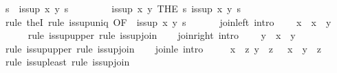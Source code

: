 \begin{isabellebody}
\ s\ \ {\isachardoublequoteopen}is{\isacharunderscore}sup\ x\ y\ s{\isachardoublequoteclose}\ \isacommand{{\isachardot}{\isachardot}}\isamarkupfalse%
\isanewline
\ \ \ \ \isamarkupfalse%
\ \isamarkupfalse%
\ {\isachardoublequoteopen}is{\isacharunderscore}sup\ x\ y\ {\isacharparenleft}THE\ s{\isachardot}\ is{\isacharunderscore}sup\ x\ y\ s{\isacharparenright}{\isachardoublequoteclose}\isanewline
\ \ \ \ \ \ \isamarkupfalse%
\ {\isacharparenleft}rule\ theI{\isacharparenright}\ {\isacharparenleft}rule\ is{\isacharunderscore}sup{\isacharunderscore}uniq\ {\isacharbrackleft}OF\ {\isacharunderscore}\ {\isacharbackquoteopen}is{\isacharunderscore}sup\ x\ y\ s{\isacharbackquoteclose}{\isacharbrackright}{\isacharparenright}\isanewline
\ \ \isamarkupfalse%
\isanewline
\isanewline
\ \ \isamarkupfalse%
\ join{\isacharunderscore}left\ {\isacharbrackleft}intro{\isacharquery}{\isacharbrackright}{\isacharcolon}\isanewline
\ \ \ \ {\isachardoublequoteopen}x\ {\isasymsqsubseteq}\ x\ {\isasymsqunion}\ y{\isachardoublequoteclose}\isanewline
\ \ \ \ \isamarkupfalse%
\ {\isacharparenleft}rule\ is{\isacharunderscore}sup{\isacharunderscore}upper{\isacharparenright}\ {\isacharparenleft}rule\ is{\isacharunderscore}sup{\isacharunderscore}join{\isacharparenright}\isanewline
\isanewline
\ \ \isamarkupfalse%
\ join{\isacharunderscore}right\ {\isacharbrackleft}intro{\isacharquery}{\isacharbrackright}{\isacharcolon}\isanewline
\ \ \ \ {\isachardoublequoteopen}y\ {\isasymsqsubseteq}\ x\ {\isasymsqunion}\ y{\isachardoublequoteclose}\isanewline
\ \ \ \ \isamarkupfalse%
\ {\isacharparenleft}rule\ is{\isacharunderscore}sup{\isacharunderscore}upper{\isacharparenright}\ {\isacharparenleft}rule\ is{\isacharunderscore}sup{\isacharunderscore}join{\isacharparenright}\isanewline
\isanewline
\ \ \isamarkupfalse%
\ join{\isacharunderscore}le\ {\isacharbrackleft}intro{\isacharquery}{\isacharbrackright}{\isacharcolon}\isanewline
\ \ \ \ {\isachardoublequoteopen}{\isasymlbrakk}\ x\ {\isasymsqsubseteq}\ z{\isacharsemicolon}\ y\ {\isasymsqsubseteq}\ z\ {\isasymrbrakk}\ {\isasymLongrightarrow}\ x\ {\isasymsqunion}\ y\ {\isasymsqsubseteq}\ z{\isachardoublequoteclose}\isanewline
\ \ \ \ \isamarkupfalse%
\ {\isacharparenleft}rule\ is{\isacharunderscore}sup{\isacharunderscore}least{\isacharparenright}\ {\isacharparenleft}rule\ is{\isacharunderscore}sup{\isacharunderscore}join{\isacharparenright}\isanewline
\isanewline
\ \ \isamarkupfalse%

\end{isabellebody}

